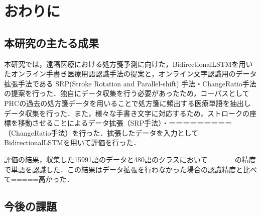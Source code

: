 
\chapter{おわりに}
\label{cha:conclu}

\section{本研究の主たる成果}
\label{sec:main-result}

本研究では，遠隔医療における処方箋予測に向けた，BidirectionalLSTMを用いたオンライン手書き医療用語認識手法の提案と，オンライン文字認識用のデータ拡張手法である SRP(Stroke Rotation and Parallel-shift) 手法・ChangeRatio手法の提案を行った．独自にデータ収集を行う必要があったため，コーパスとしてPHCの過去の処方箋データを用いることで処方箋に頻出する医療単語を抽出しデータ収集を行った．また，様々な手書き文字に対応するため，ストロークの座標を移動させることによるデータ拡張（SRP手法）・ーーーーーーーーー（ChangeRatio手法）を行った．拡張したデータを入力としてBidirectionalLSTMを用いて評価を行った．

評価の結果，収集した15991語のデータと480語のクラスにおいて=====の精度で単語を認識した．この結果はデータ拡張を行わなかった場合の認識精度と比べて=====高かった．
\section{今後の課題}
\label{sec:future}

